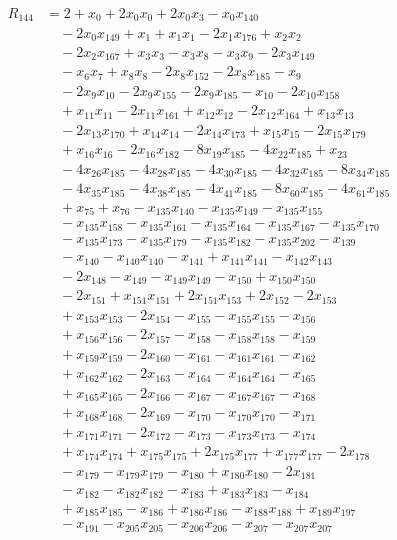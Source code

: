 \begin{align*}
R_{144}&={}2 +x_{0} +2x_{0}x_{0} +2x_{0}x_{3} -x_{0}x_{140}\\
&\quad{}-2x_{0}x_{149} +x_{1} +x_{1}x_{1} -2x_{1}x_{176} +x_{2}x_{2}\\
&\quad{}-2x_{2}x_{167} +x_{3}x_{3} -x_{3}x_{8} -x_{3}x_{9} -2x_{3}x_{149}\\
&\quad{}-x_{6}x_{7} +x_{8}x_{8} -2x_{8}x_{152} -2x_{8}x_{185} -x_{9}\\
&\quad{}-2x_{9}x_{10} -2x_{9}x_{155} -2x_{9}x_{185} -x_{10} -2x_{10}x_{158}\\
&\quad{}+x_{11}x_{11} -2x_{11}x_{161} +x_{12}x_{12} -2x_{12}x_{164} +x_{13}x_{13}\\
&\quad{}-2x_{13}x_{170} +x_{14}x_{14} -2x_{14}x_{173} +x_{15}x_{15} -2x_{15}x_{179}\\
&\quad{}+x_{16}x_{16} -2x_{16}x_{182} -8x_{19}x_{185} -4x_{22}x_{185} +x_{23}\\
&\quad{}-4x_{26}x_{185} -4x_{28}x_{185} -4x_{30}x_{185} -4x_{32}x_{185} -8x_{34}x_{185}\\
&\quad{}-4x_{35}x_{185} -4x_{38}x_{185} -4x_{41}x_{185} -8x_{60}x_{185} -4x_{61}x_{185}\\
&\quad{}+x_{75} +x_{76} -x_{135}x_{140} -x_{135}x_{149} -x_{135}x_{155}\\
&\quad{}-x_{135}x_{158} -x_{135}x_{161} -x_{135}x_{164} -x_{135}x_{167} -x_{135}x_{170}\\
&\quad{}-x_{135}x_{173} -x_{135}x_{179} -x_{135}x_{182} -x_{135}x_{202} -x_{139}\\
&\quad{}-x_{140} -x_{140}x_{140} -x_{141} +x_{141}x_{141} -x_{142}x_{143}\\
&\quad{}-2x_{148} -x_{149} -x_{149}x_{149} -x_{150} +x_{150}x_{150}\\
&\quad{}-2x_{151} +x_{151}x_{151} +2x_{151}x_{153} +2x_{152} -2x_{153}\\
&\quad{}+x_{153}x_{153} -2x_{154} -x_{155} -x_{155}x_{155} -x_{156}\\
&\quad{}+x_{156}x_{156} -2x_{157} -x_{158} -x_{158}x_{158} -x_{159}\\
&\quad{}+x_{159}x_{159} -2x_{160} -x_{161} -x_{161}x_{161} -x_{162}\\
&\quad{}+x_{162}x_{162} -2x_{163} -x_{164} -x_{164}x_{164} -x_{165}\\
&\quad{}+x_{165}x_{165} -2x_{166} -x_{167} -x_{167}x_{167} -x_{168}\\
&\quad{}+x_{168}x_{168} -2x_{169} -x_{170} -x_{170}x_{170} -x_{171}\\
&\quad{}+x_{171}x_{171} -2x_{172} -x_{173} -x_{173}x_{173} -x_{174}\\
&\quad{}+x_{174}x_{174} +x_{175}x_{175} +2x_{175}x_{177} +x_{177}x_{177} -2x_{178}\\
&\quad{}-x_{179} -x_{179}x_{179} -x_{180} +x_{180}x_{180} -2x_{181}\\
&\quad{}-x_{182} -x_{182}x_{182} -x_{183} +x_{183}x_{183} -x_{184}\\
&\quad{}+x_{185}x_{185} -x_{186} +x_{186}x_{186} -x_{188}x_{188} +x_{189}x_{197}\\
&\quad{}-x_{191} -x_{205}x_{205} -x_{206}x_{206} -x_{207} -x_{207}x_{207}
\end{align*}
